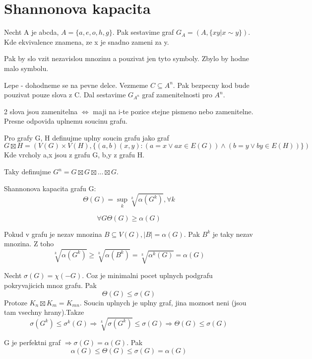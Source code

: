 \section{\texorpdfstring{Shannonova kapacita}{Shannonova kapacita}}
\vspace{5mm}
\large

\begin{definition}
Necht A je abcda, $A = \{a, e, o, h, g\}$.
Pak sestavime graf $G_A = (A, \{xy | x \sim y \})$. Kde ekvivalence znamena, ze x je snadno zameni za y.
\end{definition}
Pak by slo vzit nezavislou mnozinu a pouzivat jen tyto symboly. Zbylo by hodne malo symbolu.

Lepe - dohodneme se na pevne delce. Vezmeme $C \subseteq A^n$. Pak bezpecny kod bude pouzivat pouze slova z C.
Dal sestavime $G_{A^n}$ graf zamenitelnosti pro $A^n$.

\begin{observation}
	2 slova jsou zamenitelna $\iff$ maji na i-te pozice stejne pismeno nebo zamenitelne. Presne odpovida uplnemu soucinu grafu.
\end{observation}

\begin{definition}
	Pro grafy G, H definujme uplny soucin grafu jako graf
\[ G \boxtimes H = (V(G) \times V(H), \{(a, b)(x, y): (a = x \lor ax \in E(G)) \land (b = y \lor by \in E(H))\}) \]
Kde vrcholy a,x jsou z grafu G, b,y z grafu H.

	Taky definujme $G^n = G \boxtimes G \boxtimes ... \boxtimes G$.
\end{definition}
\begin{definition}
	Shannonova kapacita grafu G:
	\[ \Theta(G) = \sup_k \sqrt[k]{\alpha(G^k)}, \forall k \]
\end{definition}
\begin{observation}
	\[\forall G \Theta(G) \geq \alpha(G)\]

	Pokud v grafu je nezav mnozina $B \subseteq V(G), |B| = \alpha(G)$. Pak $B^k$ je taky nezav mnozina.
	Z toho
	\[ \sqrt[k]{\alpha(G^k)} \geq \sqrt[k]{\alpha(B^k)} = \sqrt[k]{\alpha^k(G)} = \alpha(G) \]
\end{observation}
\begin{observation}
	Necht $\sigma(G) = \chi(-G)$. Coz je minimalni pocet uplnych podgrafu pokryvajicich mnoz grafu. Pak
	\[ \Theta(G) \leq \sigma(G) \]
	Protoze $K_n \boxtimes K_m = K_{mn}$. Soucin uplnych je uplny graf, jina moznost neni (jsou tam vsechny hrany).Takze
	\[ \sigma(G^k) \leq \sigma^k(G) \Rightarrow \sqrt[k]{\sigma(G^k)} \leq \sigma(G) \Rightarrow \Theta(G) \leq \sigma(G) \]
\end{observation}
\begin{observation}
	G je perfektni graf $\Rightarrow \sigma(G) = \alpha(G)$. Pak
	\[ \alpha(G) \leq \Theta(G) \leq \sigma(G) = \alpha(G) \]
\end{observation}

